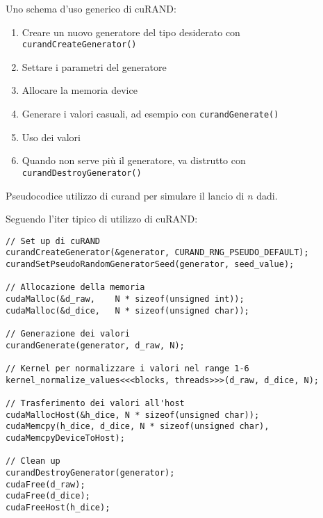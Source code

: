 \begin{questions}
\begin{solution}
        Uno schema d'uso generico di cuRAND:
        \begin{enumerate}
            \item Creare un nuovo generatore del tipo desiderato con \texttt{curandCreateGenerator()}
            
            \item Settare i parametri del generatore 
            
            \item Allocare la memoria device 
            
            \item Generare i valori casuali, ad esempio con \texttt{curandGenerate()}
            
            \item Uso dei valori 
            
            \item Quando non serve più il generatore, va distrutto con \texttt{curandDestroyGenerator()}
        \end{enumerate}
    \end{solution}
    
    \question Pseudocodice utilizzo di curand per simulare il lancio di $n$ dadi.
    
    \begin{solution}
        Seguendo l'iter tipico di utilizzo di cuRAND:
        \begin{verbatim}
// Set up di cuRAND
curandCreateGenerator(&generator, CURAND_RNG_PSEUDO_DEFAULT);
curandSetPseudoRandomGeneratorSeed(generator, seed_value);

// Allocazione della memoria
cudaMalloc(&d_raw,    N * sizeof(unsigned int));
cudaMalloc(&d_dice,   N * sizeof(unsigned char));

// Generazione dei valori
curandGenerate(generator, d_raw, N);

// Kernel per normalizzare i valori nel range 1-6
kernel_normalize_values<<<blocks, threads>>>(d_raw, d_dice, N);

// Trasferimento dei valori all'host
cudaMallocHost(&h_dice, N * sizeof(unsigned char));
cudaMemcpy(h_dice, d_dice, N * sizeof(unsigned char),
cudaMemcpyDeviceToHost);

// Clean up
curandDestroyGenerator(generator);
cudaFree(d_raw);
cudaFree(d_dice);
cudaFreeHost(h_dice);
        \end{verbatim}
    \end{solution}
    

\end{questions}

